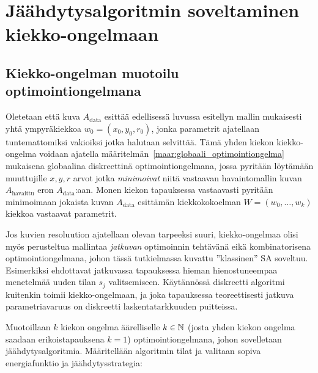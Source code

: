 \chapter{Jäähdytysalgoritmin soveltaminen kiekko-ongelmaan}
\label{cha:algoritmin_soveltaminen}

\section{Kiekko-ongelman muotoilu optimointiongelmana}
\label{sec:kiekko_ongelman_muotoilu_optimointiongelmana}

Oletetaan että kuva $A_\text{data}$ esittää edellisessä luvussa esitellyn mallin mukaisesti yhtä ympyräkiekkoa $w_0 = (x_0, y_0, r_0)$,
jonka parametrit ajatellaan tuntemattomiksi vakioiksi jotka halutaan selvittää.
Tämä yhden kiekon kiekko-ongelma voidaan ajatella määritelmän~\ref{maar:globaali_optimointiongelma} mukaisena globaalina diskreettinä optimointiongelmana,
jossa pyritään löytämään muuttujille $x, y, r$ arvot jotka \emph{minimoivat} niitä vastaavan havaintomallin kuvan $A_\text{havaittu}$ eron $A_{\text{data}}$:aan.
Monen kiekon tapauksessa vastaavasti pyritään minimoimaan jokaista kuvan $A_{\text{data}}$ esittämän kiekkokokoelman $W = (w_0, \dots, w_k)$ kiekkoa vastaavat parametrit.

Jos kuvien resoluution ajatellaan olevan tarpeeksi suuri,
kiekko-ongelmaa olisi myös perusteltua mallintaa \emph{jatkuvan} optimoinnin tehtävänä eikä kombinatorisena optimointiongelmana,
johon tässä tutkielmassa kuvattu ''klassinen'' SA soveltuu.
Esimerkiksi \textcite{recipes07} ehdottavat jatkuvassa tapauksessa hieman hienostuneempaa menetelmää uuden tilan $s_j$ valitsemiseen.
Käytännössä diskreetti algoritmi kuitenkin toimii kiekko-ongelmaan,
ja joka tapauksessa teoreettisesti jatkuva parametriavaruus on diskreetti laskentatarkkuuden puitteissa.

Muotoillaan $k$ kiekon ongelma äärelliselle $k \in \mathbb{N}$ (josta yhden kiekon ongelma saadaan erikoistapauksena $k=1$) optimointiongelmana,
johon sovelletaan jäähdytysalgoritmia.
Määritellään algoritmin tilat ja valitaan sopiva energiafunktio ja jäähdytysstrategia:

